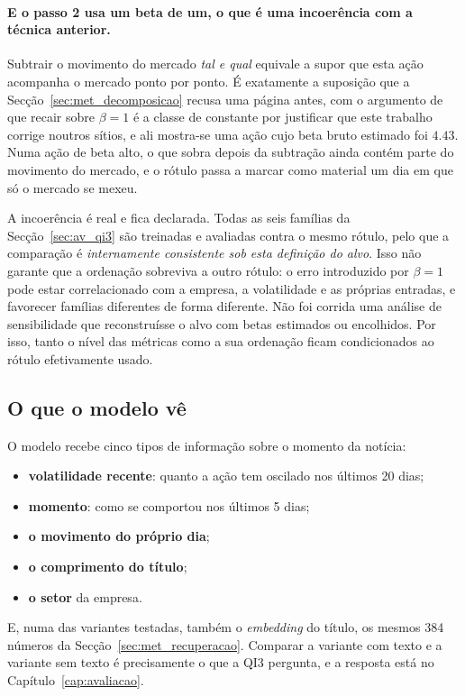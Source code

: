 \paragraph{E o passo 2 usa um beta de um, o que é uma incoerência com a técnica anterior.}
Subtrair o movimento do mercado \emph{tal e qual} equivale a supor que esta ação acompanha o
mercado ponto por ponto. É exatamente a suposição que a Secção~\ref{sec:met_decomposicao} recusa
uma página antes, com o argumento de que recair sobre $\beta = 1$ é a classe de constante por
justificar que este trabalho corrige noutros sítios, e ali mostra-se uma ação cujo beta bruto
estimado foi $4.43$. Numa ação de beta alto, o que sobra depois da subtração ainda contém parte do
movimento do mercado, e o rótulo passa a marcar como material um dia em que só o mercado se mexeu.

A incoerência é real e fica declarada. Todas as seis famílias da Secção~\ref{sec:av_qi3} são
treinadas e avaliadas contra o mesmo rótulo, pelo que a comparação é \emph{internamente
consistente sob esta definição do alvo}. Isso não garante que a ordenação sobreviva a outro rótulo:
o erro introduzido por $\beta=1$ pode estar correlacionado com a empresa, a volatilidade e as
próprias entradas, e favorecer famílias diferentes de forma diferente. Não foi corrida uma análise
de sensibilidade que reconstruísse o alvo com betas estimados ou encolhidos. Por isso, tanto o nível
das métricas como a sua ordenação ficam condicionados ao rótulo efetivamente usado.

\subsection{O que o modelo vê}
\label{sec:met_modelo_ve}

O modelo recebe cinco tipos de informação sobre o momento da notícia:

\begin{itemize}
  \item \textbf{volatilidade recente}: quanto a ação tem oscilado nos últimos 20 dias;
  \item \textbf{momento}: como se comportou nos últimos 5 dias;
  \item \textbf{o movimento do próprio dia};
  \item \textbf{o comprimento do título};
  \item \textbf{o setor} da empresa.
\end{itemize}

E, numa das variantes testadas, também o \emph{embedding} do título, os mesmos 384 números da
Secção~\ref{sec:met_recuperacao}. Comparar a variante com texto e a variante sem texto é
precisamente o que a \gls{QI}3 pergunta, e a resposta está no Capítulo~\ref{cap:avaliacao}.

